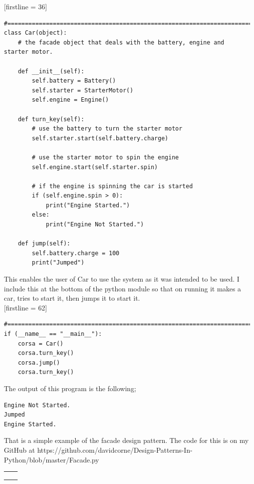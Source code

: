 \documentclass[12pt, oneside]{book} %
\newcommand{\HRule}{\rule{\linewidth}{0.5mm}} %
\newcommand{\tmpsection}[1]{}
\let\tmpsection=\section
\renewcommand{\section}[1]{
  { 
    \samepage{
      \vspace{10 mm} \linespread{0.75} \color{RoyalBlue}{
        \noindent \HRule \tmpsection{#1} \noindent \HRule
      }
    }
  }
}
\newcommand{\patternSummaryGoalMotProCon}[4]{
  \begin{center}
    \begin{tabular}{|l|p{12cm} |}
      \hline
      \color{RoyalBlue}{Goal} & #1
      \\
      \hline
      \color{RoyalBlue}{Motivation} & #2
      \\ 
      \hline
      \color{RoyalBlue}{Pros} & #3
      \\ 
      \hline
      \color{RoyalBlue}{Cons} & #4
      \\ 
      \hline
    \end{tabular}
  \end{center}
}
\begin{document}
[firstline = 36]
\begin{lstlisting}
#==============================================================================
class Car(object):
    # the facade object that deals with the battery, engine and starter motor.
    
    def __init__(self):
        self.battery = Battery()
        self.starter = StarterMotor()
        self.engine = Engine()
        
    def turn_key(self):
        # use the battery to turn the starter motor
        self.starter.start(self.battery.charge)

        # use the starter motor to spin the engine
        self.engine.start(self.starter.spin)
        
        # if the engine is spinning the car is started
        if (self.engine.spin > 0):
            print("Engine Started.")
        else:
            print("Engine Not Started.")

    def jump(self):
        self.battery.charge = 100
        print("Jumped")
\end{lstlisting}

This enables the user of Car to use the system as it was intended to be used. I include this at the bottom of the python module so that on running it makes a car, tries to start it, then jumps it to start it. \\

[firstline = 62]
\begin{lstlisting}
#==============================================================================
if (__name__ == "__main__"):
    corsa = Car()
    corsa.turn_key()
    corsa.jump()
    corsa.turn_key()
\end{lstlisting}

The output of this program is the following; \\

\begin{lstlisting}
Engine Not Started.
Jumped
Engine Started.
\end{lstlisting}

That is a simple example of the facade design pattern. The code for this is on my GitHub at https://github.com/davidcorne/Design-Patterns-In-Python/blob/master/Facade.py

\section{Flyweight}
\patternSummaryGoalMotProCon{}{}{}{}
\end{document}
